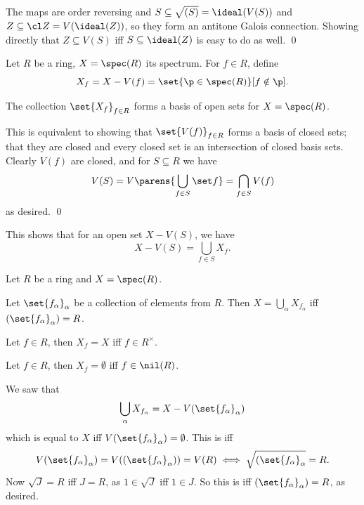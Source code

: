 \ecoro

\bproof

    The maps are order reversing and $S\subseteq\sqrt{(S)}=\ideal(V(S))$ and $Z\subseteq\cl Z=V(\ideal(Z))$, so they form an antitone Galois connection.
    Showing directly that $Z\subseteq V(S)$ iff $S\subseteq\ideal(Z)$ is easy to do as well.
    \qed

\eproof

\bdefn

    Let $R$ be a ring, $X=\spec(R)$ its spectrum.
    For $f\in R$, define
    $$ X_f = X - V(f) = \set{\p\in\spec(R)}[f\notin\p] . $$

\edefn

\bprop

    The collection $\set{X_f}_{f\in R}$ forms a basis of open sets for $X=\spec(R)$.

\eprop

\bproof

    This is equivalent to showing that $\set{V(f)}_{f\in R}$ forms a basis of closed sets; that they are closed and every closed set is an intersection of closed basis sets.
    Clearly $V(f)$ are closed, and for $S\subseteq R$ we have
    $$ V(S) = V\parens{\bigcup_{f\in S}\set f} = \bigcap_{f\in S}V(f) $$
    as desired.
    \qed

\eproof

This shows that for an open set $X-V(S)$, we have
$$ X - V(S) = \bigcup_{f\in S}X_f . $$

\bprop

    Let $R$ be a ring and $X=\spec(R)$.
    \benum
        \item Let $\set{f_\alpha}_\alpha$ be a collection of elements from $R$.
        Then $X=\bigcup_\alpha X_{f_\alpha}$ iff $(\set{f_\alpha}_\alpha)=R$.
        \item Let $f\in R$, then $X_f=X$ iff $f\in R^\times$.
        \item Let $f\in R$, then $X_f=\emptyset$ iff $f\in\nil(R)$.
    \eenum

\eprop

\bproof

    We saw that
    $$ \bigcup_\alpha X_{f_\alpha} = X - V(\set{f_\alpha}_\alpha) $$
    which is equal to $X$ iff $V(\set{f_\alpha}_\alpha)=\emptyset$.
    This is iff
    $$ V(\set{f_\alpha}_\alpha) = V((\set{f_\alpha}_\alpha)) = V(R) \iff \sqrt{(\set{f_\alpha}_\alpha} = R . $$
    Now $\sqrt J=R$ iff $J=R$, as $1\in\sqrt J$ iff $1\in J$.
    So this is iff $(\set{f_\alpha}_\alpha)=R$, as desired.

